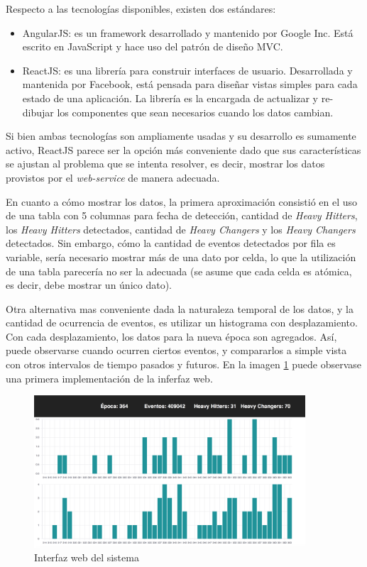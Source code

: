 \documentclass[a4paper,10pt, oneside]{article}
\begin{document}
Respecto a las tecnologías disponibles, existen dos estándares:
\begin{itemize}
	\item AngularJS: es un framework desarrollado y mantenido por Google Inc. Está escrito en JavaScript y hace uso del patrón de diseño MVC.
	\item ReactJS: es una librería para construir interfaces de usuario. Desarrollada y mantenida por Facebook, está pensada para diseñar vistas simples para cada estado de una aplicación. La librería es la encargada de actualizar y re-dibujar los componentes que sean necesarios cuando los datos cambian.
\end{itemize}

Si bien ambas tecnologías son ampliamente usadas y su desarrollo es sumamente activo, ReactJS parece ser la opción más conveniente dado que sus características se ajustan al problema que se intenta resolver, es decir, mostrar los datos provistos por el \textit{web-service} de manera adecuada.

En cuanto a cómo mostrar los datos, la primera aproximación consistió en el uso de una tabla con 5 columnas para fecha de detección, cantidad de \textit{Heavy Hitters}, los \textit{Heavy Hitters} detectados, cantidad de \textit{Heavy Changers} y los \textit{Heavy Changers} detectados. Sin embargo, cómo la cantidad de eventos detectados por fila es variable, sería necesario mostrar más de una dato por celda, lo que la utilización de una tabla parecería no ser la adecuada (se asume que cada celda es atómica, es decir, debe mostrar un único dato).

Otra alternativa mas conveniente dada la naturaleza temporal de los datos, y la cantidad de ocurrencia de eventos, es utilizar un histograma con desplazamiento. Con cada desplazamiento, los datos para la nueva época son agregados. Así, puede observarse cuando ocurren ciertos eventos, y compararlos a simple vista con otros intervalos de tiempo pasados y futuros. En la imagen \ref{fig:ui} puede observase una primera implementación de la inferfaz web.

\begin{figure}[htbp]
	\centering
	\includegraphics[width=0.9\textwidth]{./graph/ui.png}
	\caption{Interfaz web del sistema}
	\label{fig:ui}
\end{figure}
\end{document}

